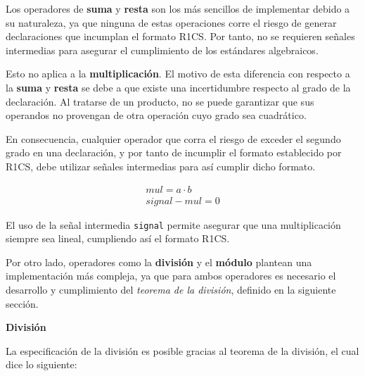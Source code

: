 \documentclass[a4paper,12pt]{report}
\begin{document}
	\noindent Los operadores de \textbf{suma} y \textbf{resta} son los más sencillos de implementar debido a su naturaleza, ya que ninguna de estas operaciones corre el riesgo de generar declaraciones que incumplan el formato R1CS. Por tanto, no se requieren señales intermedias para asegurar el cumplimiento de los estándares algebraicos.
	
	\vspace{0.2cm}
	\noindent Esto no aplica a la \textbf{multiplicación}. El motivo de esta diferencia con respecto a la \textbf{suma} y \textbf{resta} se debe a que existe una incertidumbre respecto al grado de la declaración. Al tratarse de un producto, no se puede garantizar que sus operandos no provengan de otra operación cuyo grado sea cuadrático.
	
	\vspace{0.2cm}
	\noindent En consecuencia, cualquier operador que corra el riesgo de exceder el segundo grado en una declaración, y por tanto de incumplir el formato establecido por R1CS, debe utilizar señales intermedias para así cumplir dicho formato.
	
	\begin{equation*} 
		\begin{aligned}
			mul = a \cdot b \\ 
			signal - mul = 0
		\end{aligned}
	\end{equation*}
	
	\vspace{0.2cm}
	\noindent El uso de la señal intermedia \texttt{signal} permite asegurar que una multiplicación siempre sea lineal, cumpliendo así el formato R1CS.
	
	\vspace{0.2cm}
	\noindent Por otro lado, operadores como la \textbf{división} y el \textbf{módulo} plantean una implementación más compleja, ya que para ambos operadores es necesario el desarrollo y cumplimiento del \textit{teorema de la división}, definido en la siguiente sección.
	
	
	\vspace{0.6cm}
	\noindent \textbf{División}
	\vspace{0.2cm}
	\label{sss:division}
	
	\vspace{0.2cm}
	\noindent La especificación de la división es posible gracias al teorema de la división, el cual dice lo siguiente:
	
\end{document}
